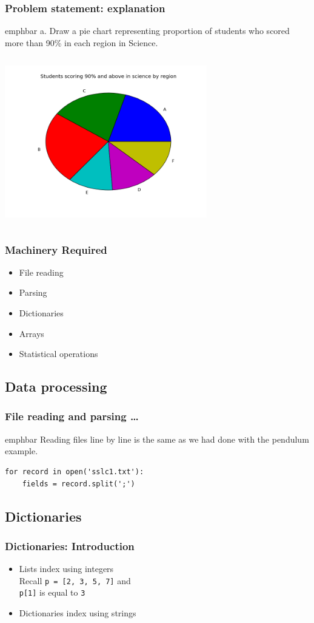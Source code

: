 \documentclass[14pt,compress]{beamer}
\newcommand{\emphbar}[1]
{\begin{beamercolorbox}[rounded=true]{emphbar} 
      {#1}
 \end{beamercolorbox}
}
\newcommand{\typ}[1]{\lstinline{#1}}
\begin{document}
\begin{frame}
  \frametitle{Problem statement: explanation}
    \emphbar{a. Draw a pie chart representing proportion of students who scored more than 90\% in each region in Science.}
\begin{columns}
    \hspace*{.5in}
\includegraphics[height=2.6in, interpolate=true]{data/science}
\end{columns}
\end{frame}

\begin{frame}
  \frametitle{Machinery Required}
  \begin{itemize}
    \item File reading
    \item Parsing
    \item Dictionaries 
    \item Arrays
    \item Statistical operations
  \end{itemize}
\end{frame}

\subsection{Data processing}
\begin{frame}[fragile]
  \frametitle{File reading and parsing \ldots}
\emphbar{Reading files line by line is the same as we had done with the pendulum example.}

  \begin{lstlisting}
for record in open('sslc1.txt'):
    fields = record.split(';')
  \end{lstlisting}
\end{frame}

\subsection{Dictionaries}
\begin{frame}[fragile]
  \frametitle{Dictionaries: Introduction}
  \begin{itemize}
    \item Lists index using integers\\
Recall \typ{p = [2, 3, 5, 7]} and\\
\typ{p[1]} is equal to \typ{3}
    \item Dictionaries index using strings
  \end{itemize}
\end{frame}
\end{document}
